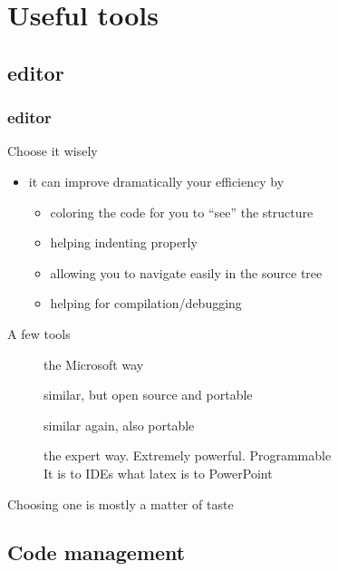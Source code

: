\section[Tool]{Useful tools}

\subsection[Editor]{\cpp editor}

\begin{frame}[fragile]
  \frametitle{\cpp editor}
  \begin{block}{Choose it wisely}
    \begin{itemize}
    \item it can improve dramatically your efficiency by
      \begin{itemize}
      \item coloring the code for you to ``see'' the structure
      \item helping indenting properly
      \item allowing you to navigate easily in the source tree
      \item helping for compilation/debugging
      \end{itemize}
    \end{itemize}
  \end{block}
  \begin{block}{A few tools}
    \begin{description}
    \item[\href{http://www.microsoft.com/}{}]
      the Microsoft way
    \item[\href{https://www.eclipse.org/}{}]
      similar, but open source and portable
    \item[\href{https://netbeans.org/features/cpp/}{}]
      similar again, also portable
    \item[\href{http://www.gnu.org/software/emacs/}{}]
      the expert way. Extremely powerful. Programmable \\
      It is to IDEs what latex is to PowerPoint
    \end{description}
    Choosing one is mostly a matter of taste
  \end{block}
\end{frame}

\subsection[VCS]{Code management}

